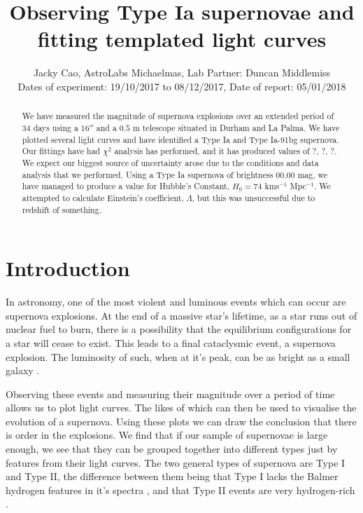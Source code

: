 \documentclass[twocolumn]{revtex4}
\begin{document}
\textheight=26.385cm

\title{Observing Type Ia supernovae and fitting templated light curves}
 
\author{Jacky Cao, AstroLabs Michaelmas, Lab Partner: Duncan Middlemiss \\ Dates of experiment: 19/10/2017 to 08/12/2017, Date of report: 05/01/2018}

\begin{abstract}              
We have measured the magnitude of supernova explosions over an extended period of 34 days using a $16''$ and a $0.5$ m telescope situated in Durham and La Palma. We have plotted several light curves and have identified a Type Ia and Type Ia-91bg supernova. Our fittings have had $\chi^2$ analysis has performed, and it has produced values of ?, ?, ?. We expect our biggest source of uncertainty arose due to the conditions and data analysis that we performed. Using a Type Ia supernova of brightness $00.00$ mag, we have managed to produce a value for Hubble's Constant, $H_0 = 74$ kms$^{-1}$ Mpc$^{-1}$. We attempted to calculate Einstein's coefficient, $\Lambda$, but this was unsuccessful due to redshift of something.
\end{abstract}

\maketitle

\vspace{-3ex}
\section{Introduction} 
\label{intro}
\vspace{-2ex}
In astronomy, one of the most violent and luminous events which can occur are supernova explosions. At the end of a massive star's lifetime, as a star runs out of nuclear fuel to burn, there is a possibility that the equilibrium configurations for a star will cease to exist. This leads to a final cataclysmic event, a supernova explosion. The luminosity of such, when at it's peak, can be as bright as a small galaxy \cite{longair}.

Observing these events and measuring their magnitude over a period of time allows us to plot light curves. The likes of which can then be used to visualise the evolution of a supernova. Using these plots we can draw the conclusion that there is order in the explosions. We find that if our sample of supernovae is large enough, we see that they can be grouped together into different types just by features from their light curves. The two general types of supernova are Type I and Type II, the difference between them being that Type I lacks the Balmer hydrogen features in it's spectra \cite{longair}, and that Type II events are very hydrogen-rich \cite{obs_phys_class_sn}.
\end{document}

